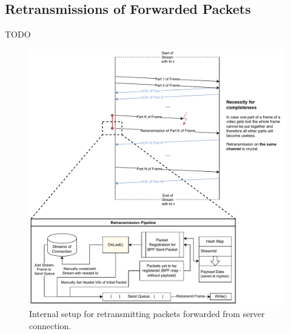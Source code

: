\subsection{Retransmissions of Forwarded Packets}
TODO
\begin{figure}[H]
    \centering
    \includegraphics[width=\textwidth]{figures/03_fast_relays/retransmission.drawio.pdf}
    \caption[Packet retransmission schematic]{Internal setup for retransmitting packets forwarded from server connection.}\label{fig:packet-retransmission}
\end{figure}